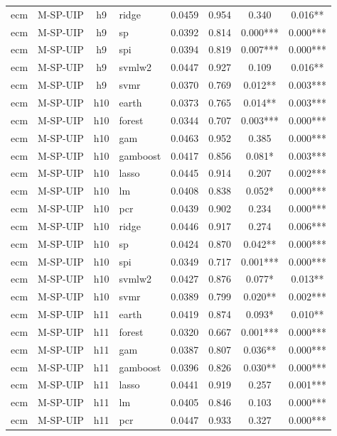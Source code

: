 \begin{ThreePartTable}
\begin{longtable}[t]{llclcccc}
ecm & M-SP-UIP & h9 & ridge & 0.0459 & 0.954 & 0.340 & 0.016**\\
ecm & M-SP-UIP & h9 & sp & 0.0392 & 0.814 & 0.000*** & 0.000***\\
ecm & M-SP-UIP & h9 & spi & 0.0394 & 0.819 & 0.007*** & 0.000***\\
ecm & M-SP-UIP & h9 & svmlw2 & 0.0447 & 0.927 & 0.109 & 0.016**\\
ecm & M-SP-UIP & h9 & svmr & 0.0370 & 0.769 & 0.012** & 0.003***\\
\addlinespace
ecm & M-SP-UIP & h10 & earth & 0.0373 & 0.765 & 0.014** & 0.003***\\
ecm & M-SP-UIP & h10 & forest & 0.0344 & 0.707 & 0.003*** & 0.000***\\
ecm & M-SP-UIP & h10 & gam & 0.0463 & 0.952 & 0.385 & 0.000***\\
ecm & M-SP-UIP & h10 & gamboost & 0.0417 & 0.856 & 0.081* & 0.003***\\
ecm & M-SP-UIP & h10 & lasso & 0.0445 & 0.914 & 0.207 & 0.002***\\
ecm & M-SP-UIP & h10 & lm & 0.0408 & 0.838 & 0.052* & 0.000***\\
ecm & M-SP-UIP & h10 & pcr & 0.0439 & 0.902 & 0.234 & 0.000***\\
ecm & M-SP-UIP & h10 & ridge & 0.0446 & 0.917 & 0.274 & 0.006***\\
ecm & M-SP-UIP & h10 & sp & 0.0424 & 0.870 & 0.042** & 0.000***\\
ecm & M-SP-UIP & h10 & spi & 0.0349 & 0.717 & 0.001*** & 0.000***\\
ecm & M-SP-UIP & h10 & svmlw2 & 0.0427 & 0.876 & 0.077* & 0.013**\\
ecm & M-SP-UIP & h10 & svmr & 0.0389 & 0.799 & 0.020** & 0.002***\\
\addlinespace
ecm & M-SP-UIP & h11 & earth & 0.0419 & 0.874 & 0.093* & 0.010**\\
ecm & M-SP-UIP & h11 & forest & 0.0320 & 0.667 & 0.001*** & 0.000***\\
ecm & M-SP-UIP & h11 & gam & 0.0387 & 0.807 & 0.036** & 0.000***\\
ecm & M-SP-UIP & h11 & gamboost & 0.0396 & 0.826 & 0.030** & 0.000***\\
ecm & M-SP-UIP & h11 & lasso & 0.0441 & 0.919 & 0.257 & 0.001***\\
ecm & M-SP-UIP & h11 & lm & 0.0405 & 0.846 & 0.103 & 0.000***\\
ecm & M-SP-UIP & h11 & pcr & 0.0447 & 0.933 & 0.327 & 0.000***\\

\end{longtable}
\end{ThreePartTable}
